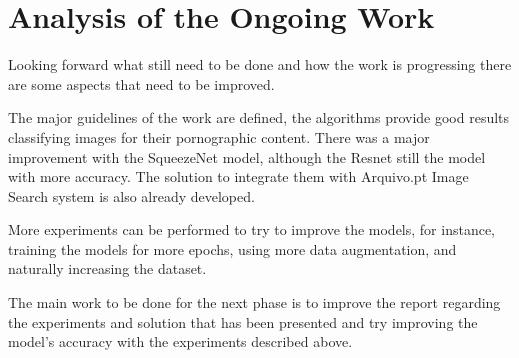 \chapter{Analysis of the Ongoing Work}

Looking forward what still need to be done and how the work is progressing there are some aspects that need to be improved.

The major guidelines of the work are defined, the algorithms provide good results classifying images for their pornographic content. There was a major improvement with the SqueezeNet model, although the Resnet still the model with more accuracy. The solution to integrate them with Arquivo.pt Image Search system is also already developed.

More experiments can be performed to try to improve the models, for instance, training the models for more epochs, using more data augmentation, and naturally increasing the dataset.

The main work to be done for the next phase is to improve the report regarding the experiments and solution that has been presented and try improving the model's accuracy with the experiments described above.